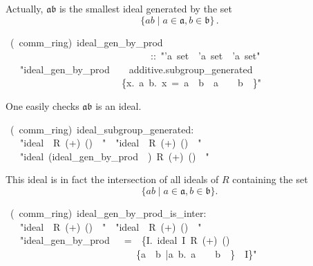 \documentclass[12pt]{scrartcl}
\begin{document}
Actually, $\mathfrak{a} \mathfrak{b}$ is the smallest ideal generated by the set 
	\[
	\lbrace a b \mid a \in \mathfrak{a}, b \in \mathfrak{b} \rbrace \, .
	\]
	

\begin{isabelle}
\ (\ comm\_ring)\ ideal\_gen\_by\_prod\ \isanewline
\ \ \ \ \ \ \ \ \ \ \ \ \ \ \ \ \ \ \ \ \ \ \ \ \ \ \ \ \ \ ::\ "'a\ set\ \isasymRightarrow \ 'a\ set\ \isasymRightarrow \ 'a\ set"\isanewline
\ \ \ "ideal\_gen\_by\_prod\ \isasymaa \ \isasymbb \ \isasymequiv \ additive.subgroup\_generated\ \isanewline
\ \ \ \ \ \ \ \ \ \ \ \ \ \ \ \ \ \ \ \ \ \ \ \ \{x.\ \isasymexists a\ b.\ x\ =\ a\ \isasymcdot \ b\ \isasymand \ a\ \isasymin \ \isasymaa \ \isasymand \ b\ \isasymin \ \isasymbb \}"
\end{isabelle}

One easily checks $\mathfrak{a} \mathfrak{b}$ is an ideal.


\begin{isabelle}
\ (\ comm\_ring)\ ideal\_subgroup\_generated:\isanewline
\ \ \ "ideal\ \isasymaa \ R\ (+)\ (\isasymcdot )\ \isasymzero \ \isasymone "\ \ "ideal\ \isasymbb \ R\ (+)\ (\isasymcdot )\ \isasymzero \ \isasymone "\isanewline
\ \ \ "ideal\ (ideal\_gen\_by\_prod\ \isasymaa \ \isasymbb )\ R\ (+)\ (\isasymcdot )\ \isasymzero \ \isasymone "
\end{isabelle}

This ideal is in fact the intersection of all ideals of $R$ containing the set
	\[
	\lbrace a b \mid a \in \mathfrak{a}, b \in \mathfrak{b} \rbrace .
	\]
	
\begin{isabelle}
\ (\ comm\_ring)\ ideal\_gen\_by\_prod\_is\_inter:\isanewline
\ \ \ "ideal\ \isasymaa \ R\ (+)\ (\isasymcdot )\ \isasymzero \ \isasymone "\ \ "ideal\ \isasymbb \ R\ (+)\ (\isasymcdot )\ \isasymzero \ \isasymone "\isanewline
\ \ \ "ideal\_gen\_by\_prod\ \isasymaa \ \isasymbb \ =\ \isasymInter \ \{I.\ ideal\ I\ R\ (+)\ (\isasymcdot )\ \isasymzero \ \isasymone \ \isanewline
\ \ \ \ \ \ \ \ \ \ \ \ \ \ \ \ \ \ \ \ \ \ \ \ \ \ \isasymand \ \{a\ \isasymcdot \ b\ |a\ b.\ a\ \isasymin \ \isasymaa \ \isasymand \ b\ \isasymin \ \isasymbb \}\ \isasymsubseteq \ I\}"
\end{isabelle}
\end{document}
